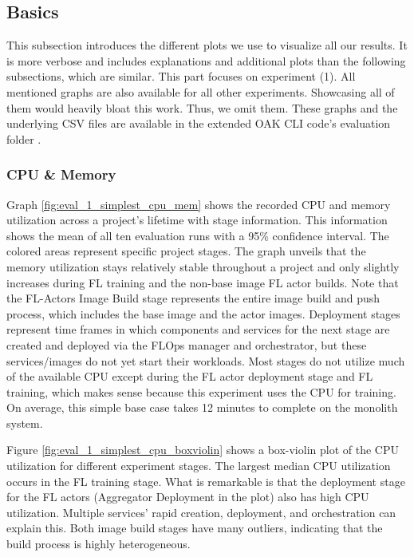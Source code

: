 \subsection{Basics}

This subsection introduces the different plots we use to visualize all our results.
It is more verbose and includes explanations and additional plots than the following subsections, which are similar.
This part focuses on experiment (1).
All mentioned graphs are also available for all other experiments.
Showcasing all of them would heavily bloat this work.
Thus, we omit them.
These graphs and the underlying CSV files are available in the extended OAK CLI code's evaluation folder \cite{cli_code}.

\subsubsection{CPU \& Memory}

Graph \ref{fig:eval_1_simplest_cpu_mem} shows the recorded CPU and memory utilization across a project's lifetime with stage information.
This information shows the mean of all ten evaluation runs with a 95\% confidence interval.
The colored areas represent specific project stages.
The graph unveils that the memory utilization stays relatively stable throughout a project and only slightly increases during FL training and the non-base image FL actor builds.
Note that the FL-Actors Image Build stage represents the entire image build and push process, which includes the base image and the actor images.
Deployment stages represent time frames in which components and services for the next stage are created and deployed via the FLOps manager and orchestrator, but these services/images do not yet start their workloads.
Most stages do not utilize much of the available CPU except during the FL actor deployment stage and FL training, which makes sense because this experiment uses the CPU for training.
On average, this simple base case takes 12 minutes to complete on the monolith system.

Figure \ref{fig:eval_1_simplest_cpu_boxviolin} shows a box-violin plot of the CPU utilization for different experiment stages.
The largest median CPU utilization occurs in the FL training stage.
What is remarkable is that the deployment stage for the FL actors (Aggregator Deployment in the plot) also has high CPU utilization.
Multiple services' rapid creation, deployment, and orchestration can explain this.
Both image build stages have many outliers, indicating that the build process is highly heterogeneous.

